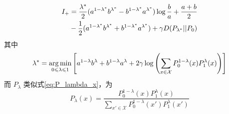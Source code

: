 \begin{lemma}\label{lem:I_plus_expression}
\begin{align}\label{equation:I+}
    I_+ &=\frac{\lambda^* }{2} (a^{1-\lambda^* }b^{\lambda^* } -
    b^{1-\lambda^* }a^{\lambda^* })\log\frac{b}{a}+\frac{a+b}{2}\notag \\
    &\quad -\frac{1}{2}(a^{1-\lambda^*}b^{\lambda^*} +
    b^{1-\lambda^* }a^{\lambda^* })+\gamma D(P_{\lambda^* }||P_0) 
	\end{align}
	其中
	\begin{equation}\label{eq:lambda}
    \lambda^* = \argmin_{0 \leq \lambda \leq 1} \left[ a^{1-\lambda}b^{\lambda} +
    b^{1-\lambda}a^{\lambda} + 2\gamma \log
    \left(\sum_{x\in \mathcal{X}}P^{1-\lambda}_0(x) P^{\lambda}_1(x)
    \right)      \right]
\end{equation}
而 $P_{\lambda}$ 类似式\eqref{eq:P_lambda_x}，为
\begin{equation}\label{eq:P_lambda_0_1}
    P_{\lambda}(x) = \frac{P_0^{1-\lambda}(x) P_1^{\lambda} (x)}
    {\sum_{x' \in \mathcal{X}}P_0^{1-\lambda}(x') 
    P_1^{\lambda} (x')}        
\end{equation}

\end{lemma}


